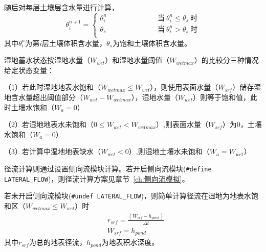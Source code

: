 随后对每层土壤层含水量进行计算，
\begin{equation}
    \theta_{i}^{n+1}=\begin{cases}
        \theta_{i}^{n} &\qquad \quad \qquad \quad \;\text{当}\ \theta_{i}^{n} \leqslant \theta_{s} \ \text{时} \\
        \theta_{s}     &\qquad \quad \qquad \quad \;\text{当}\ \theta_{i}^{n} > \theta_{s} \ \text{时} \\
    \end{cases}
\end{equation}
其中$\theta_{i}^{n}$为第$i$层土壤体积含水量，$\theta_{s}$为饱和土壤体积含水量。

湿地蓄水状态按湿地水量（$W_{wet}$）和湿地水量阈值（$W_{wetmax}$）的比较分三种情况给定状态变量：

（1）若此时湿地地表水饱和（$W_{wetmax} \leq W_{wet}$），则使用表面水量（$W_{srf}$）储存湿地含水量超出阈值部分（$W_{wet}-W_{wetmax}$），湿地水量（$W_{wet}$）则等于饱和值，此时土壤水饱和（$W_{a}=0$）

（2）若湿地地表水未饱和（$0 \leq W_{wet} < W_{wetmax}$）,则表面水量（$W_{srf}$）为0，土壤水饱和（$W_{a}=0$）

（3）若计算中湿地地表缺水（$W_{wet} < 0$）,则湿地土壤水未饱和（$W_{a}=W_{wet}$）

径流计算则通过设置侧向流模块计算。若开启侧向流模块(\texttt{\#define LATERAL\_FLOW})，则径流计算方案见章节~\ref{ch:侧向流模拟}。

若未开启侧向流模块(\texttt{\#undef LATERAL\_FLOW})，则简单计算径流在湿地为地表水饱和区（$W_{wetmax} \leq W_{wet}$）时
\begin{equation}
\begin{aligned}
&r_{srf}=\frac{\left(W_{srf}-h_{pond}\right)}{\Delta t} \\
&W_{srf}=h_{pond}
\end{aligned}
\end{equation}
其中$r_{srf}$为总的地表径流，$h_{pond}$为地表积水深度。

